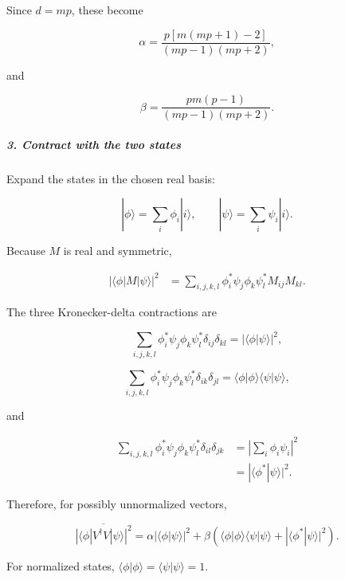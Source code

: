 Since $d=mp$, these become

\[
\alpha = \frac{ p\left[m(mp+1)-2\right] }{ (mp-1)(mp+2) },
\]

and

\[
\beta = \frac{ pm(p-1) }{ (mp-1)(mp+2) }.
\]

\subparagraph*{3. Contract with the two states}

Expand the states in the chosen real basis:

\[
|\phi\rangle=\sum_i\phi_i|i\rangle, \qquad |\psi\rangle=\sum_i\psi_i|i\rangle.
\]

Because $M$ is real and symmetric,

\[
\begin{aligned}
\left|\langle\phi|M|\psi\rangle\right|^2
&=
\sum_{i,j,k,l}
\phi_i^*\psi_j\phi_k\psi_l^*
M_{ij}M_{kl}.
\end{aligned}
\]

The three Kronecker-delta contractions are

\[
\sum_{i,j,k,l} \phi_i^*\psi_j\phi_k\psi_l^* \delta_{ij}\delta_{kl} = |\langle\phi|\psi\rangle|^2,
\]

\[
\sum_{i,j,k,l} \phi_i^*\psi_j\phi_k\psi_l^* \delta_{ik}\delta_{jl} = \langle\phi|\phi\rangle\langle\psi|\psi\rangle,
\]

and

\[
\begin{aligned}
\sum_{i,j,k,l}
\phi_i^*\psi_j\phi_k\psi_l^*
\delta_{il}\delta_{jk}
&=
\left|\sum_i\phi_i\psi_i\right|^2
\\
&=
|\langle\phi^*|\psi\rangle|^2.
\end{aligned}
\]

Therefore, for possibly unnormalized vectors,

\[
\overline{ \left|\langle\phi|V^\dagger V|\psi\rangle\right|^2 } = \alpha|\langle\phi|\psi\rangle|^2 + \beta\left( \langle\phi|\phi\rangle\langle\psi|\psi\rangle + |\langle\phi^*|\psi\rangle|^2 \right).
\]

For normalized states, $\langle\phi|\phi\rangle=\langle\psi|\psi\rangle=1$.
